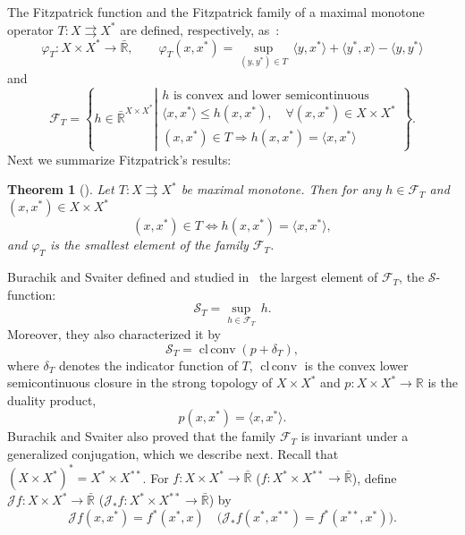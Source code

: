 \documentclass[11pt]{article}
\newcommand{\F}{\mathcal{F}}
\newcommand{\J}{\mathcal{J}}
\newcommand{\R}{\mathbb{R}}
\newcommand{\BR}{\bar{\mathbb{R}}}
\DeclareMathOperator{\clconv}{cl\,conv}
\newcommand{\inner}[2]{\langle{#1},{#2}\rangle}
\newcommand{\tos}{\rightrightarrows} %
\newtheorem{theorem}{Theorem}[section]
\begin{document}
The Fitzpatrick function and the Fitzpatrick family of a maximal
monotone operator $T:X\tos X^*$ are defined, respectively,
as~\cite{fit-rep.pcmaanu88}:
\begin{equation}\label{fitz}
  \varphi_T:X\times X^*\to \BR,\qquad
  \varphi_T(x,x^*)
 =\sup_{(y,y^*)\in T}\,\inner{y}{x^*}+\inner{y^*}{x}-\inner{y}{y^*}
\end{equation}
and
%
\begin{equation} \label{eq:def.ft} \F_T=\left\{ h\in \BR^{X\times X^*}
    \left|
      \begin{array}{ll}
        h\mbox{ is convex and lower semicontinuous}\\
        \inner{x}{x^*}\leq h(x,x^*),\quad \forall (x,x^*)\in X\times X^*\\
        (x,x^*)\in T 
        \Rightarrow 
        h(x,x^*) = \inner{x}{x^*}
      \end{array}
    \right.
  \right\}.
\end{equation}
%
Next we summarize Fitzpatrick's results:
%
\begin{theorem}[\mbox{\cite[Theorem 3.10]{fit-rep.pcmaanu88}}] \label{th:fitz} 
  Let $T:X\tos X^*$ be maximal
  monotone. Then for any $h\in \F_T$  and $(x,x^*)\in X\times X^*$
  \[
  (x,x^*)\in T\iff h(x,x^*)=\inner{x}{x^*},
  \]
  and $\varphi_T$  is the smallest element
  of the  family $\F_T$.
\end{theorem}
% 
Burachik and Svaiter defined and studied in~\cite{bur.sva-max.sva02}
the largest element of $\F_T$, the $\mathcal{S}$-function:
%
\begin{equation}\label{eq:def.s}
 \mathcal{S}_T=\sup_{h\in \F_T}\,h.
\end{equation}
%
Moreover, they also characterized it by
%
\begin{equation}\label{eq:char.s}
 \mathcal{S}_T=\clconv (p+\delta_T),
\end{equation}
%
where $\delta_T$ denotes the indicator function of $T$, $\clconv$ is
the convex lower semicontinuous closure in the strong topology of
$X\times X^*$ and $p:X\times X^*\to \R$ is the duality product,
\[
 p(x,x^*)=\inner{x}{x^*}.
\]
%
Burachik and Svaiter also proved that the family $\F_T$ is invariant under a
generalized conjugation, which we describe next.
Recall that $(X\times X^*)^*=X^*\times X^{**}$.
For $f:X\times X^*\to \BR$ \big($f:X^*\times X^{**}\to \BR$\big), define 
$\J f:X\times X^*\to \BR$ \big($\J_* f:X^*\times X^{**}\to \BR$\big) by
%
\[
 \J f(x,x^*)=f^*(x^*,x)\quad \big(\J_* f(x^*,x^{**})=f^*(x^{**},x^*)\big).
\]
\end{document}
